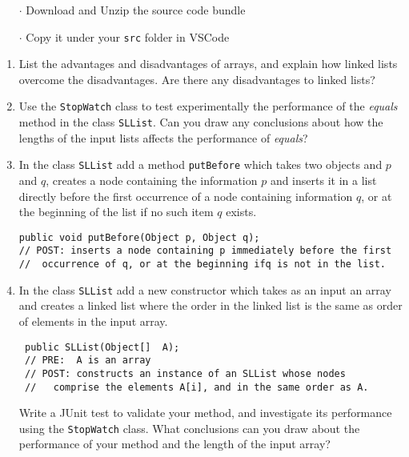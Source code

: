 \documentclass[twoside=false,DIV=14]{scrartcl}
\begin{document}
\begin{itemize}
\item[$\cdot$] Download and Unzip the source code bundle 
\item[$\cdot$] Copy it under your \texttt{src} folder in VSCode
\end{itemize}

\begin{enumerate}
\item List the advantages and disadvantages of arrays, and explain how  linked lists overcome the disadvantages. Are there any disadvantages to linked lists? 

\item Use the {\tt StopWatch} class to test experimentally the performance of the \emph{equals} method in the class {\tt SLList}.  Can you draw any conclusions about how the lengths of the input lists affects the performance of \emph{equals}?

\item In the class {\tt SLList} add  a method {\tt putBefore} which takes two objects and $p$ and $q$, creates a node containing the information $p$ and inserts it in a list directly before the first occurrence of a node containing information $q$, or at the beginning of the list if no such item $q$ exists. 

\begin{verbatim}
public void putBefore(Object p, Object q);
// POST: inserts a node containing p immediately before the first 
//  occurrence of q, or at the beginning ifq is not in the list.
\end{verbatim}

\item  In the class {\tt SLList} add a new constructor which takes as an input an array and creates a linked list where the order in the linked list is the same as order of elements in the input array.

\begin{verbatim}
 public SLList(Object[]  A);
 // PRE:  A is an array
 // POST: constructs an instance of an SLList whose nodes  
 //   comprise the elements A[i], and in the same order as A.
\end{verbatim}

 Write a JUnit test to validate your method, and investigate its performance using the {\tt StopWatch} class.  What conclusions can you draw about the performance of your method and the length of the input array?


\end{enumerate}
\end{document}
